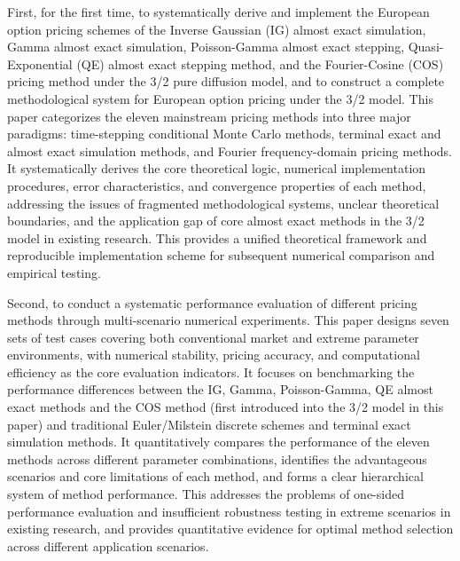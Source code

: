 First, for the first time, to systematically derive and implement the European option pricing schemes of the Inverse Gaussian (IG) almost exact simulation, Gamma almost exact simulation, Poisson-Gamma almost exact stepping, Quasi-Exponential (QE) almost exact stepping method, and the Fourier-Cosine (COS) pricing method under the 3/2 pure diffusion model, and to construct a complete methodological system for European option pricing under the 3/2 model. This paper categorizes the eleven mainstream pricing methods into three major paradigms: time-stepping conditional Monte Carlo methods, terminal exact and almost exact simulation methods, and Fourier frequency-domain pricing methods. It systematically derives the core theoretical logic, numerical implementation procedures, error characteristics, and convergence properties of each method, addressing the issues of fragmented methodological systems, unclear theoretical boundaries, and the application gap of core almost exact methods in the 3/2 model in existing research. This provides a unified theoretical framework and reproducible implementation scheme for subsequent numerical comparison and empirical testing.

Second, to conduct a systematic performance evaluation of different pricing methods through multi-scenario numerical experiments. This paper designs seven sets of test cases covering both conventional market and extreme parameter environments, with numerical stability, pricing accuracy, and computational efficiency as the core evaluation indicators. It focuses on benchmarking the performance differences between the IG, Gamma, Poisson-Gamma, QE almost exact methods and the COS method (first introduced into the 3/2 model in this paper) and traditional Euler/Milstein discrete schemes and terminal exact simulation methods. It quantitatively compares the performance of the eleven methods across different parameter combinations, identifies the advantageous scenarios and core limitations of each method, and forms a clear hierarchical system of method performance. This addresses the problems of one-sided performance evaluation and insufficient robustness testing in extreme scenarios in existing research, and provides quantitative evidence for optimal method selection across different application scenarios.

